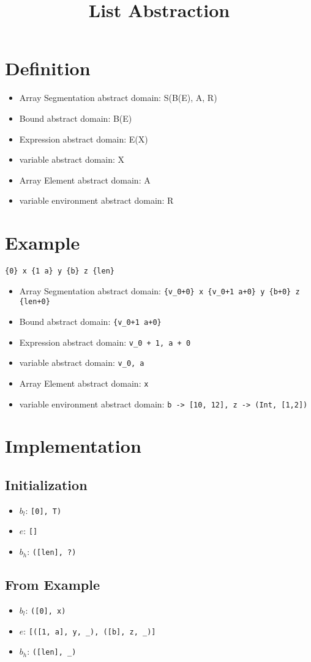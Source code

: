 \documentclass[11pt]{article}
\begin{document}
\title{List Abstraction}

\maketitle


\section{Definition}

\begin{itemize}
\item Array Segmentation abstract domain: S(B(E), A, R)
\item Bound abstract domain: B(E)
\item Expression abstract domain: E(X)
\item variable abstract domain: X
\item Array Element abstract domain: A
\item variable environment abstract domain: R
\end{itemize}

\section{Example}

\verb|{0} x {1 a} y {b} z {len}|

\begin{itemize}
\item Array Segmentation abstract domain: \verb|{v_0+0} x {v_0+1 a+0} y {b+0} z {len+0}|
\item Bound abstract domain: \verb|{v_0+1 a+0}|
\item Expression abstract domain: \verb|v_0 + 1, a + 0|
\item variable abstract domain: \verb|v_0, a|
\item Array Element abstract domain: \verb|x|
\item variable environment abstract domain: \verb|b -> [10, 12], z -> (Int, [1,2])|
\end{itemize}

\section{Implementation}

\subsection{Initialization}

\begin{itemize}
\item $b_l$: \verb|[0], T)|
\item $e$: \verb|[]|
\item $b_h$: \verb|([len], ?)|
\end{itemize}

\subsection{From Example}

\begin{itemize}
\item $b_l$: \verb|([0], x)|
\item $e$: \verb|[([1, a], y, _), ([b], z, _)]|
\item $b_h$: \verb|([len], _)|
\end{itemize}
\end{document}
